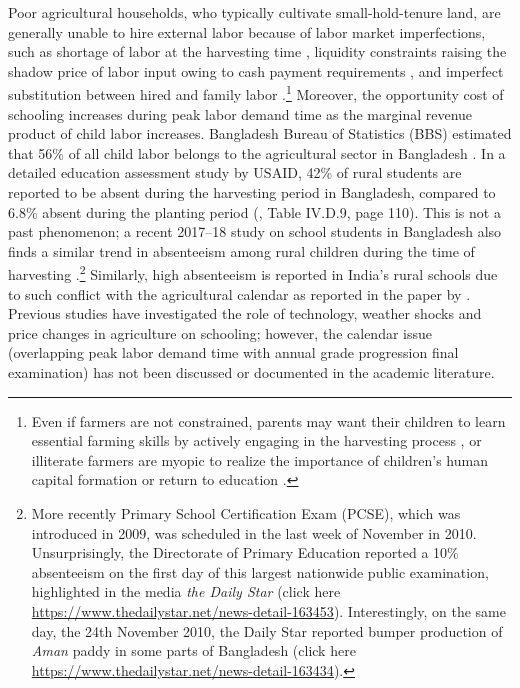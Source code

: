 \documentclass[12pt,letterpaper]{article}
\newcommand{\0}{\ensuremath{\mbox{\boldmath $0$}}}
\begin{document}
Poor agricultural households, who typically cultivate small-hold-tenure land, are generally unable to hire external labor because of labor market imperfections, such as shortage of labor at the harvesting time \citep{rosenzweig1988labor}, liquidity constraints raising the shadow price of labor input owing to cash payment requirements \citep{singh1986agricultural}, and imperfect substitution between hired and family labor \citep{de1991peasant}.\footnote{Even if farmers are not constrained, parents may want their children to learn essential farming skills by actively engaging in the harvesting process \citep{bhalotra2003child}, or illiterate farmers are myopic to realize the importance of children’s human capital formation or return to education \citep{BalandRobinson2000}.} Moreover, the opportunity cost of schooling increases during peak labor demand time as the marginal revenue product of child labor increases. Bangladesh Bureau of Statistics (BBS) estimated that 56\% of all child labor belongs to the agricultural sector in Bangladesh \citep{bbs2003report}. In a detailed education assessment study by USAID, 42\% of rural students are reported to be absent during the harvesting period in Bangladesh, compared to 6.8\% absent during the planting period (\cite{Rahman2004}, Table IV.D.9, page 110). This is not a past phenomenon; a recent 2017–18 study on school students in Bangladesh also finds a similar trend in absenteeism among rural children during the time of harvesting \citep{Fujii2019}.\footnote{More recently Primary School Certification Exam (PCSE), which was introduced in 2009, was scheduled in the last week of November in 2010. Unsurprisingly, the Directorate of Primary Education reported a 10$\%$ absenteeism on the first day of this largest nationwide public examination, highlighted in the media \textit{the Daily Star} (click here \url{https://www.thedailystar.net/news-detail-163453}). Interestingly, on the same day, the 24th November 2010, the Daily Star reported bumper production of \textit{Aman} paddy in some parts of Bangladesh (click here \url{https://www.thedailystar.net/news-detail-163434}).} Similarly, high absenteeism is reported in India's rural schools due to such conflict with the agricultural calendar as reported in the paper by \cite{de2016estimating}. Previous studies have investigated the role of technology, weather shocks and price changes in agriculture on schooling; however, the calendar issue (overlapping peak labor demand time with annual grade progression final examination) has not been discussed or documented in the academic literature.
\end{document}
